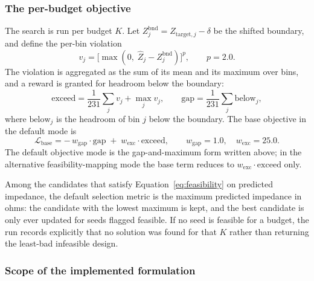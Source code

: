 
\subsubsection*{The per-budget objective}

The search is run per budget $K$. Let $Z^{\mathrm{bnd}}_j = Z_{\mathrm{target},j} - \delta$
be the shifted boundary, and define the per-bin violation
\begin{equation}
v_j = \big[\max(0,\; \hat{Z}_j - Z^{\mathrm{bnd}}_j)\big]^{p},
\qquad p = 2.0 .
\label{eq:violation}
\end{equation}
The violation is aggregated as the sum of its mean and its maximum over bins,
and a reward is granted for headroom below the boundary:
\begin{equation}
\mathrm{exceed} = \frac{1}{231}\sum_j v_j + \max_j v_j,
\qquad
\mathrm{gap} = \frac{1}{231}\sum_j \mathrm{below}_j ,
\label{eq:exceed_gap}
\end{equation}
where $\mathrm{below}_j$ is the headroom of bin $j$ below the boundary. The base
objective in the default mode is
\begin{equation}
\mathcal{L}_{\mathrm{base}}
= -\,w_{\mathrm{gap}} \cdot \mathrm{gap} \;+\; w_{\mathrm{exc}} \cdot \mathrm{exceed},
\qquad
w_{\mathrm{gap}} = 1.0, \quad w_{\mathrm{exc}} = 25.0 .
\label{eq:base_objective}
\end{equation}
The default objective mode is the gap-and-maximum form written above; in the
alternative feasibility-mapping mode the base term reduces to
$w_{\mathrm{exc}} \cdot \mathrm{exceed}$ only.

Among the candidates that satisfy Equation~\ref{eq:feasibility} on predicted
impedance, the default selection metric is the maximum predicted impedance in
ohms: the candidate with the lowest maximum is kept, and the best candidate is
only ever updated for seeds flagged feasible. If no seed is feasible for a
budget, the run records explicitly that no solution was found for that $K$ rather
than returning the least-bad infeasible design.

\subsubsection*{Scope of the implemented formulation}


